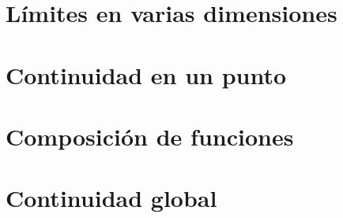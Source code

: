 \section{Límites en varias dimensiones}

\section{Continuidad en un punto}

\section{Composición de funciones}

\section{Continuidad global}
